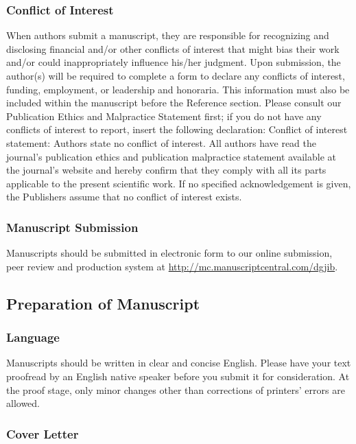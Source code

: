 \documentclass{jib}
\begin{document}
\subsubsection{Conflict of Interest} 

When authors submit a manuscript, they are responsible for recognizing and
disclosing financial and/or other conflicts of interest that might bias their
work and/or could inappropriately influence his/her judgment. Upon submission,
the author(s) will be required to complete a form to declare any conflicts of
interest, funding, employment, or leadership and honoraria. This information
must also be included within the manuscript before the Reference section. Please
consult our Publication Ethics and Malpractice Statement first; if you do not
have any conflicts of interest to report, insert the following declaration:
Conflict of interest statement: Authors state no conflict of interest. All
authors have read the journal's publication ethics and publication malpractice
statement available at the journal's website and hereby confirm that they comply
with all its parts applicable to the present scientific work.
If no specified acknowledgement is given, the Publishers assume that no conflict
of interest exists.


\subsubsection{Manuscript Submission} 

Manuscripts should be submitted in
electronic form to our online submission, peer review and production system at
\url{http://mc.manuscriptcentral.com/dgjib}.


\subsection{Preparation of Manuscript}

\subsubsection{Language}

Manuscripts should be written in clear and concise English. Please have your
text proofread by an English native speaker before you submit it for
consideration. At the proof stage, only minor changes other than corrections of
printers' errors are allowed.

\subsubsection{Cover Letter}
\end{document}

